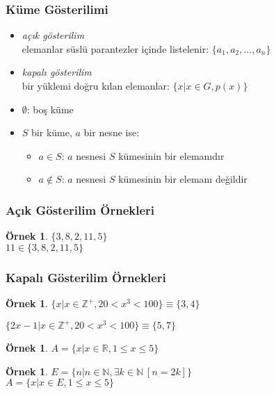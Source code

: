 \documentclass[dvipsnames]{beamer}
\theoremstyle{definition}
\theoremstyle{example}
\newtheorem{ornek}[theorem]{Örnek}
\theoremstyle{plain}
\begin{document}
\begin{frame}
  \frametitle{Küme Gösterilimi}

  \begin{itemize}
    \item \emph{açık gösterilim}\\
      elemanlar süslü parantezler içinde listelenir: $\{a_1,a_2,\dots,a_n\}$

    \pause
    \medskip
    \item \emph{kapalı gösterilim}\\
      bir yüklemi doğru kılan elemanlar: $\{x | x \in G, p(x)\}$

    \pause
    \medskip
    \item $\emptyset$: boş küme

    \pause
    \medskip
    \item $S$ bir küme, $a$ bir nesne ise:
    \begin{itemize}
      \item $a \in S$: $a$ nesnesi $S$ kümesinin bir elemanıdır
      \item $a \notin S$: $a$ nesnesi $S$ kümesinin bir elemanı değildir
    \end{itemize}
  \end{itemize}
\end{frame}

\begin{frame}
  \frametitle{Açık Gösterilim Örnekleri}

  \begin{ornek}
    $\{3,8,2,11,5\}$\\
    $11 \in \{3,8,2,11,5\}$
  \end{ornek}
\end{frame}

\begin{frame}
  \frametitle{Kapalı Gösterilim Örnekleri}

  \begin{ornek}
    $\{ x | x \in \mathbb{Z}^+, 20 < x^3 < 100 \} \equiv \{3,4\}$

    $\{ 2x-1 | x \in \mathbb{Z}^+, 20 < x^3 < 100 \} \equiv \{5,7\}$
  \end{ornek}

  \pause
  \begin{ornek}
    $A = \{ x | x \in \mathbb{R}, 1 \leq x \leq 5 \}$
  \end{ornek}

  \pause
  \begin{ornek}
    $E = \{ n | n \in \mathbb{N}, \exists k \in \mathbb{N}~[n=2k] \}$\\
    $A = \{ x | x \in E, 1 \leq x \leq 5 \}$
  \end{ornek}
\end{frame}
\end{document}
